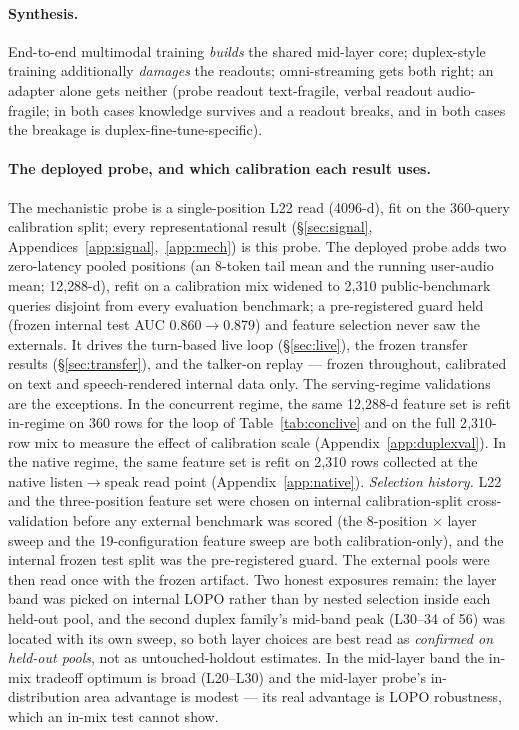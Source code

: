 \paragraph{Synthesis.} End-to-end multimodal training \emph{builds} the
shared mid-layer core; duplex-style training additionally
\emph{damages} the readouts; omni-streaming gets both right; an adapter
alone gets neither (probe readout text-fragile, verbal readout
audio-fragile; in both cases knowledge survives and a readout breaks,
and in both cases the breakage is duplex-fine-tune-specific).

\paragraph{The deployed probe, and which calibration each result
uses.} The mechanistic probe is a single-position L22 read (4096-d),
fit on the 360-query calibration split; every representational result
(\S\ref{sec:signal}, Appendices~\ref{app:signal},~\ref{app:mech}) is
this probe. The deployed probe adds two zero-latency
pooled positions (an 8-token tail mean and the running user-audio
mean; 12{,}288-d), refit on a calibration mix widened to 2{,}310 public-benchmark
queries disjoint from every evaluation benchmark; a pre-registered
guard held (frozen internal test AUC 0.860$\to$0.879) and feature
selection never saw the externals. It drives the turn-based live loop
(\S\ref{sec:live}), the frozen transfer results (\S\ref{sec:transfer}),
and the talker-on replay --- frozen throughout, calibrated on text and
speech-rendered internal data only. The serving-regime validations are
the exceptions. In the concurrent regime, the same 12{,}288-d feature
set is refit in-regime on 360 rows for the loop of
Table~\ref{tab:conclive} and on the full 2{,}310-row mix to measure the
effect of calibration scale (Appendix~\ref{app:duplexval}). In the
native regime, the same feature set is refit on 2{,}310 rows collected
at the native listen$\to$speak read point
(Appendix~\ref{app:native}).
\emph{Selection history.} L22 and the three-position feature set were
chosen on internal calibration-split cross-validation before any
external benchmark was scored (the 8-position $\times$ layer sweep and
the 19-configuration feature sweep are both calibration-only), and
the internal frozen test split was the pre-registered guard. The
external pools were then read once with the frozen artifact. Two
honest exposures remain: the layer band was picked on internal
LOPO rather than by nested selection inside each held-out pool, and
the second duplex family's mid-band peak (L30--34 of 56) was located
with its own sweep, so both layer choices are best read as
\emph{confirmed on held-out pools}, not as untouched-holdout
estimates. In the mid-layer band the in-mix
tradeoff optimum is broad (L20--L30) and the mid-layer probe's
in-distribution area advantage is modest --- its real advantage is
LOPO robustness, which an in-mix test cannot show.

